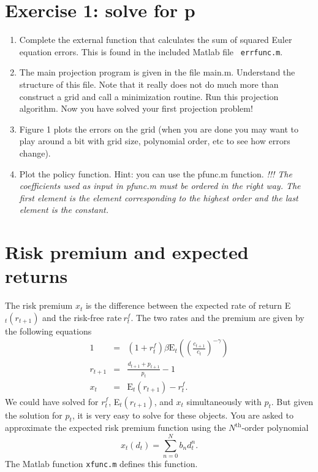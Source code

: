 \documentclass{article}
\begin{document}
\section{Exercise 1: solve for p}

\begin{enumerate}
\item Complete the external function that calculates the sum of squared
Euler equation errors. This is found in the included Matlab file \texttt{%
errfunc.m}.

\item The main projection program is given in the file main.m. Understand
the structure of this file. Note that it really does not do much more than
construct a grid and call a minimization routine. Run this projection
algorithm. Now you have solved your first projection problem!

\item Figure 1 plots the errors on the grid (when you are done you may want
to play around a bit with grid size, polynomial order, etc to see how errors
change).

\item Plot the policy function. Hint: you can use the pfunc.m function.%
\newline
\emph{!!! The coefficients used as input in pfunc.m must be ordered in the
right way. The first element is the element corresponding to the highest
order and the last element is the constant.}
\end{enumerate}

\section{Risk premium and expected returns}

The risk premium $x_{t}$ is the difference between the expected rate of
return E$_{t}\left( r_{t+1}\right) $ and the risk-free rate$~r_{t}^{f}$. The
two rates and the premium are given by the following equations%
\begin{eqnarray*}
1 &=&\left( 1+r_{t}^{f}\right) \beta \text{E}_{t}\left( \left( \frac{c_{t+1}%
}{c_{t}}\right) ^{-\gamma }\right)  \\
r_{t+1} &=&\frac{d_{t+1}+p_{t+1}}{p_{t}}-1 \\
x_{t} &=&\text{E}_{t}\left( r_{t+1}\right) -r_{t}^{f}\text{.}
\end{eqnarray*}%
We could have solved for $r_{t}^{f}$, E$_{t}\left( r_{t+1}\right) $, and $%
x_{t}$ simultaneously with $p_{t}$. But given the solution for $p_{t}$, it
is very easy to solve for these objects. You are asked to approximate the
expected risk premium function using the $N^{\text{th}}$-order polynomial%
\begin{equation*}
x_{t}\left( d_{t}\right) =\sum_{n=0}^{N}b_{n}d_{t}^{n}\text{.}
\end{equation*}%
The Matlab function \texttt{xfunc.m} defines this function.
\end{document}
